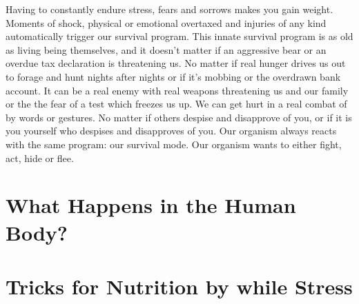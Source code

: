 \documentclass[../main.tex]{subfiles}
\begin{document}
Having to constantly endure stress, fears and sorrows makes you gain weight.
Moments of shock, physical or emotional overtaxed and injuries of any kind automatically trigger our survival program.
This innate survival program is as old as living being themselves, and it doesn't matter if an aggressive bear or an overdue tax declaration
is threatening us.
No matter if real hunger drives us out to forage and hunt nights after nights or if it's mobbing or the overdrawn bank account.
It can be a real enemy with real weapons threatening us and our family or the the fear of a test which freezes us up.
We can get hurt in a real combat of by words or gestures.
No matter if others despise and disapprove of you, or if it is you yourself who despises and disapproves of you.
Our organism always reacts with the same program: our survival mode.
Our  organism wants to either fight, act, hide or flee.

\section{What Happens in the Human Body?}



\section{Tricks for Nutrition by while Stress}


\end{document}
